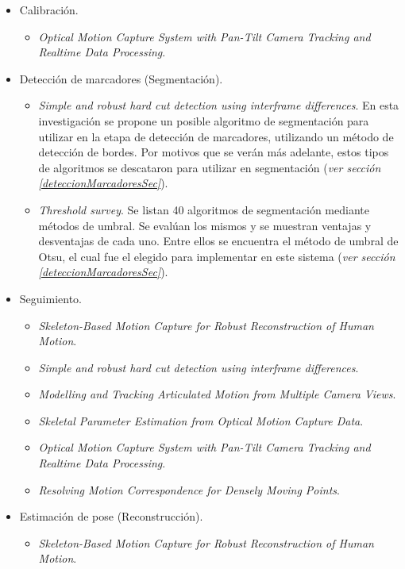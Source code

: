 \begin{itemize}
	\item Calibración.
	\begin{itemize}
		\item \emph{Optical Motion Capture System with Pan-Tilt Camera Tracking and Realtime Data Processing}.
	\end{itemize}
	\item Detección de marcadores (Segmentación).
	\begin{itemize}
		\item \emph{Simple and robust hard cut detection using interframe differences}. En esta investigación se propone un posible algoritmo de segmentación para utilizar en la etapa de detección de marcadores, utilizando un método de detección de bordes. Por motivos que se verán más adelante, estos tipos de algoritmos se descataron para utilizar en segmentación (\textit{ver sección \ref{deteccionMarcadoresSec}}).
		\item \emph{Threshold survey}\cite{surveyThreshold}. Se listan 40 algoritmos de segmentación mediante métodos de umbral. Se evalúan los mismos y se muestran ventajas y desventajas de cada uno. Entre ellos se encuentra el método de umbral de Otsu\cite{otsu}, el cual fue el elegido para implementar en este sistema (\textit{ver sección \ref{deteccionMarcadoresSec}}).
	\end{itemize}
	\item Seguimiento.
	\begin{itemize}
		\item \emph{Skeleton-Based Motion Capture for Robust Reconstruction of Human Motion}\cite{herda}.
		\item \emph{Simple and robust hard cut detection using interframe differences}.
		\item \emph{Modelling and Tracking Articulated Motion from Multiple Camera Views}.
		\item \emph{Skeletal Parameter Estimation from Optical Motion Capture Data}.
		\item \emph{Optical Motion Capture System with Pan-Tilt Camera Tracking and  Realtime Data Processing}.
		\item \emph{Resolving Motion Correspondence for Densely Moving Points}.
	\end{itemize}
	\item Estimación de pose (Reconstrucción).
	\begin{itemize}
		\item \emph{Skeleton-Based Motion Capture for Robust Reconstruction of Human Motion}\cite{herda}.

\end{itemize}
\end{itemize}
